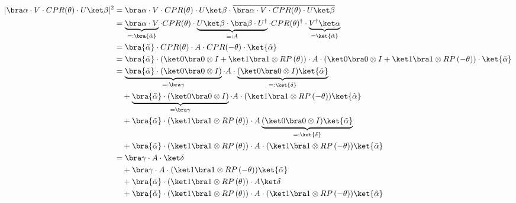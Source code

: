 \begin{equation}
    \label{eq:single-prob}
    \begin{split}
        \lvert \bra\alpha \cdot V \cdot CPR(\theta) \cdot U \ket\beta \rvert^2
            &= \bra\alpha \cdot V \cdot CPR(\theta) \cdot U \ket\beta
                \cdot \overline{\bra\alpha \cdot V \cdot CPR(\theta) \cdot U \ket\beta} \\
            &= \underbrace{\bra\alpha \cdot V}_{=: \bra{\tilde\alpha}} \cdot CPR(\theta)
                \cdot \underbrace{U \ket\beta \cdot \bra\beta \cdot U^\dagger}_{=: A} \cdot CPR(\theta)^\dagger
                \cdot \underbrace{V^\dagger \ket\alpha}_{=\ket{\tilde\alpha}} \\
            &= \bra{\tilde\alpha} \cdot CPR(\theta) \cdot A \cdot CPR(-\theta) \cdot \ket{\tilde\alpha} \\
            &= \bra{\tilde\alpha}
                \cdot \left(\ket 0 \bra 0 \otimes I + \ket 1 \bra 1 \otimes RP\left(\theta\right)\right)
                \cdot A
                \cdot \left(\ket 0 \bra 0 \otimes I + \ket 1 \bra 1 \otimes RP\left(-\theta\right)\right)
                \cdot \ket{\tilde\alpha} \\
            &= \underbrace{\bra{\tilde\alpha} \cdot (\ket 0 \bra 0 \otimes I)}_{=: \bra\gamma} \cdot A \cdot \underbrace{(\ket 0 \bra 0 \otimes I) \ket{\tilde\alpha}}_{=: \ket{\delta}} \\
                &\quad + \underbrace{\bra{\tilde\alpha} \cdot (\ket 0 \bra 0 \otimes I)}_{= \bra\gamma} \cdot A \cdot (\ket 1 \bra 1 \otimes RP\left(-\theta\right)) \ket{\tilde\alpha} \\
                &\quad + \bra{\tilde\alpha} \cdot (\ket 1 \bra 1 \otimes RP\left(\theta\right)) \cdot A \underbrace{(\ket 0 \bra 0 \otimes I) \ket{\tilde\alpha}}_{=: \ket{\delta}} \\
                &\quad + \bra{\tilde\alpha} \cdot (\ket 1 \bra 1 \otimes RP\left(\theta\right)) \cdot A \cdot (\ket 1 \bra 1 \otimes RP\left(-\theta\right)) \ket{\tilde\alpha} \\
            &= \bra\gamma \cdot A \cdot \ket\delta \\
                &\quad + \bra\gamma \cdot A \cdot (\ket 1 \bra 1 \otimes RP\left(-\theta\right)) \ket{\tilde\alpha} \\
                &\quad + \bra{\tilde\alpha} \cdot (\ket 1 \bra 1 \otimes RP\left(\theta\right)) \cdot A \ket\delta \\
                &\quad + \bra{\tilde\alpha} \cdot (\ket 1 \bra 1 \otimes RP\left(\theta\right)) \cdot A \cdot (\ket 1 \bra 1 \otimes RP\left(-\theta\right)) \ket{\tilde\alpha} \\
    \end{split}
\end{equation}

